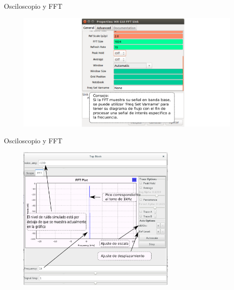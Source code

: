 \begin{frame}{Osciloscopio y FFT}
\begin{figure}[H]
\centering
\includegraphics[width=1.1\textwidth]{parte1/lab2/pdf/lab2_8.pdf}
\end{figure}
\end{frame}

\begin{frame}{Osciloscopio y FFT}
\begin{figure}[H]
\vspace{-3mm}
\centering
\includegraphics[width=0.7\textwidth]{parte1/lab2/pdf/lab2_9.pdf}
\end{figure}
\end{frame}

